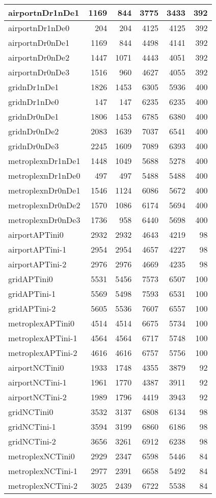 \begin{longtable}{|l|r|r|r|r|r|}
\endlastfoot
airportnDr1nDe1 & 1169 & 844 & 3775 & 3433 & 392 \\ \hline
airportnDr1nDe0 & 204 & 204 & 4125 & 4125 & 392 \\ \hline
airportnDr0nDe1 & 1169 & 844 & 4498 & 4141 & 392 \\ \hline
airportnDr0nDe2 & 1447 & 1071 & 4443 & 4051 & 392 \\ \hline
airportnDr0nDe3 & 1516 & 960 & 4627 & 4055 & 392 \\ \hline
gridnDr1nDe1 & 1826 & 1453 & 6305 & 5936 & 400 \\ \hline
gridnDr1nDe0 & 147 & 147 & 6235 & 6235 & 400 \\ \hline
gridnDr0nDe1 & 1806 & 1453 & 6785 & 6380 & 400 \\ \hline
gridnDr0nDe2 & 2083 & 1639 & 7037 & 6541 & 400 \\ \hline
gridnDr0nDe3 & 2245 & 1609 & 7089 & 6393 & 400 \\ \hline
metroplexnDr1nDe1 & 1448 & 1049 & 5688 & 5278 & 400 \\ \hline
metroplexnDr1nDe0 & 497 & 497 & 5488 & 5488 & 400 \\ \hline
metroplexnDr0nDe1 & 1546 & 1124 & 6086 & 5672 & 400 \\ \hline
metroplexnDr0nDe2 & 1570 & 1086 & 6174 & 5694 & 400 \\ \hline
metroplexnDr0nDe3 & 1736 & 958 & 6440 & 5698 & 400 \\ \hline
airportAPTini0 & 2932 & 2932 & 4643 & 4219 & 98 \\ \hline
airportAPTini-1 & 2954 & 2954 & 4657 & 4227 & 98 \\ \hline
airportAPTini-2 & 2976 & 2976 & 4669 & 4235 & 98 \\ \hline
gridAPTini0 & 5531 & 5456 & 7573 & 6507 & 100 \\ \hline
gridAPTini-1 & 5569 & 5498 & 7593 & 6531 & 100 \\ \hline
gridAPTini-2 & 5605 & 5536 & 7607 & 6557 & 100 \\ \hline
metroplexAPTini0 & 4514 & 4514 & 6675 & 5734 & 100 \\ \hline
metroplexAPTini-1 & 4564 & 4564 & 6717 & 5748 & 100 \\ \hline
metroplexAPTini-2 & 4616 & 4616 & 6757 & 5756 & 100 \\ \hline
airportNCTini0 & 1933 & 1748 & 4355 & 3879 & 92 \\ \hline
airportNCTini-1 & 1961 & 1770 & 4387 & 3911 & 92 \\ \hline
airportNCTini-2 & 1989 & 1796 & 4419 & 3943 & 92 \\ \hline
gridNCTini0 & 3532 & 3137 & 6808 & 6134 & 98 \\ \hline
gridNCTini-1 & 3594 & 3199 & 6860 & 6186 & 98 \\ \hline
gridNCTini-2 & 3656 & 3261 & 6912 & 6238 & 98 \\ \hline
metroplexNCTini0 & 2929 & 2347 & 6598 & 5446 & 84 \\ \hline
metroplexNCTini-1 & 2977 & 2391 & 6658 & 5492 & 84 \\ \hline
metroplexNCTini-2 & 3025 & 2439 & 6722 & 5538 & 84 \\ \hline
\end{longtable}
